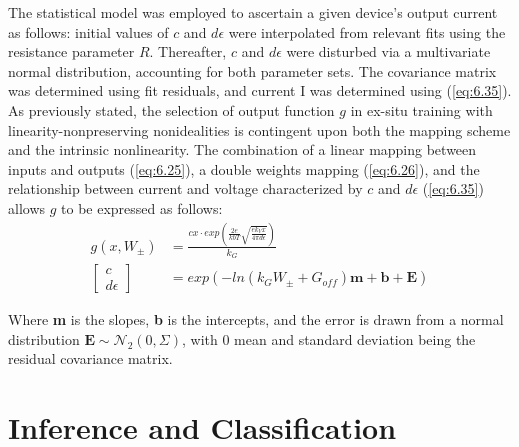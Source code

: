 \noindent The statistical model was employed to ascertain a given device's output current as follows: initial values of $c$ and $d\epsilon$ were interpolated from relevant fits using the resistance parameter $R$. Thereafter, $c$ and $d\epsilon$ were disturbed via a multivariate normal distribution, accounting for both parameter sets. The covariance matrix was determined using fit residuals, and current I was determined using (\ref{eq:6.35}).\\


\noindent As previously stated, the selection of output function $g$ in ex-situ training with linearity-nonpreserving nonidealities is contingent upon both the mapping scheme and the intrinsic nonlinearity. The combination of a linear mapping between inputs and outputs (\ref{eq:6.25}), a double weights mapping (\ref{eq:6.26}), and the relationship between current and voltage characterized by $c$ and $d\epsilon$ (\ref{eq:6.35}) allows $g$ to be expressed as follows:
\begin{align}
g\left( x, W_\pm \right) &= \frac{cx\cdot exp\left( \frac{2e}{kbT} \sqrt{\frac{ek_Vx}{4\pi d\epsilon}} \right)}{k_G} \label{eq:6.39} \\
\begin{bmatrix} c \\  d\epsilon \end{bmatrix} &= exp\left( -ln\left( k_GW_\pm + G_{off} \right)\textbf{m} + \textbf{b} + \textbf{E} \right) \label{eq:6.40}
\end{align}

\noindent Where \textbf{m} is the slopes, \textbf{b} is the intercepts, and the error is drawn from a normal distribution $\textbf{E} \sim \mathcal{N}_2\left( 0, \Sigma \right)$, with 0 mean and standard deviation being the residual covariance matrix.

\section{Inference and Classification}

